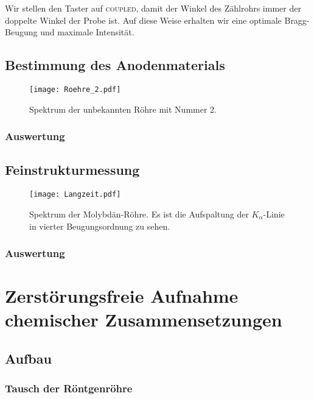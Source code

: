 \parencite{wikipedia/Goniometer}
\parencite{wikipedia/hygroskopie}
\parencite{leybold/554831}
\parencite{leybold/554800}

Wir stellen den Taster auf \textsc{coupled}, damit der Winkel des Zählrohrs immer
der doppelte Winkel der Probe ist. \parencite{leybold/554800} Auf diese Weise
erhalten wir eine optimale Bragg-Beugung und maximale Intensität.

\section{Bestimmung des Anodenmaterials}

\begin{figure}[htbp]
    \centering
    \texttt{[image: Roehre\_2.pdf]}
    \caption{%
        Spektrum der unbekannten Röhre mit Nummer 2.
    }
    \label{fig:}
\end{figure}

\subsection{Auswertung}

\section{Feinstrukturmessung}

\begin{figure}[htbp]
    \centering
    \texttt{[image: Langzeit.pdf]}
    \caption{%
        Spektrum der Molybdän-Röhre. Es ist die Aufspaltung der
        $K_\alpha$-Linie in vierter Beugungsordnung zu sehen.
    }
    \label{fig:}
\end{figure}

\subsection{Auswertung}

\chapter{Zerstörungsfreie Aufnahme chemischer Zusammensetzungen}

\section{Aufbau}

\subsection{Tausch der Röntgenröhre}

